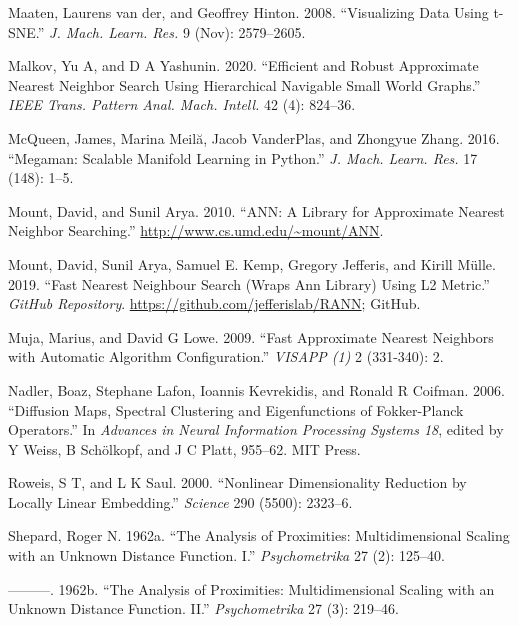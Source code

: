 \documentclass[12pt]{article}
\newlength{\cslhangindent}
\newenvironment{cslreferences}%
  {\setlength{\parindent}{0pt}%
  \everypar{\setlength{\hangindent}{\cslhangindent}}\ignorespaces}%
  {\par}
\begin{document}
\begin{cslreferences}
\leavevmode\hypertarget{ref-Maaten2008-dw}{}%
Maaten, Laurens van der, and Geoffrey Hinton. 2008. ``Visualizing Data Using t-SNE.'' \emph{J. Mach. Learn. Res.} 9 (Nov): 2579--2605.

\leavevmode\hypertarget{ref-Malkov2020-jp}{}%
Malkov, Yu A, and D A Yashunin. 2020. ``Efficient and Robust Approximate Nearest Neighbor Search Using Hierarchical Navigable Small World Graphs.'' \emph{IEEE Trans. Pattern Anal. Mach. Intell.} 42 (4): 824--36.

\leavevmode\hypertarget{ref-McQueen2016-xz}{}%
McQueen, James, Marina Meilă, Jacob VanderPlas, and Zhongyue Zhang. 2016. ``Megaman: Scalable Manifold Learning in Python.'' \emph{J. Mach. Learn. Res.} 17 (148): 1--5.

\leavevmode\hypertarget{ref-mount2010-ann}{}%
Mount, David, and Sunil Arya. 2010. ``ANN: A Library for Approximate Nearest Neighbor Searching.'' \url{http://www.cs.umd.edu/~mount/ANN}.

\leavevmode\hypertarget{ref-jefferislab2019-l2}{}%
Mount, David, Sunil Arya, Samuel E. Kemp, Gregory Jefferis, and Kirill Mülle. 2019. ``Fast Nearest Neighbour Search (Wraps Ann Library) Using L2 Metric.'' \emph{GitHub Repository}. \url{https://github.com/jefferislab/RANN}; GitHub.

\leavevmode\hypertarget{ref-Muja2009-de}{}%
Muja, Marius, and David G Lowe. 2009. ``Fast Approximate Nearest Neighbors with Automatic Algorithm Configuration.'' \emph{VISAPP (1)} 2 (331-340): 2.

\leavevmode\hypertarget{ref-Nadler2006-cm}{}%
Nadler, Boaz, Stephane Lafon, Ioannis Kevrekidis, and Ronald R Coifman. 2006. ``Diffusion Maps, Spectral Clustering and Eigenfunctions of Fokker-Planck Operators.'' In \emph{Advances in Neural Information Processing Systems 18}, edited by Y Weiss, B Schölkopf, and J C Platt, 955--62. MIT Press.

\leavevmode\hypertarget{ref-Roweis2000-ni}{}%
Roweis, S T, and L K Saul. 2000. ``Nonlinear Dimensionality Reduction by Locally Linear Embedding.'' \emph{Science} 290 (5500): 2323--6.

\leavevmode\hypertarget{ref-Shepard1962a}{}%
Shepard, Roger N. 1962a. ``The Analysis of Proximities: Multidimensional Scaling with an Unknown Distance Function. I.'' \emph{Psychometrika} 27 (2): 125--40.

\leavevmode\hypertarget{ref-Shepard1962b}{}%
---------. 1962b. ``The Analysis of Proximities: Multidimensional Scaling with an Unknown Distance Function. II.'' \emph{Psychometrika} 27 (3): 219--46.


\end{cslreferences}
\end{document}
